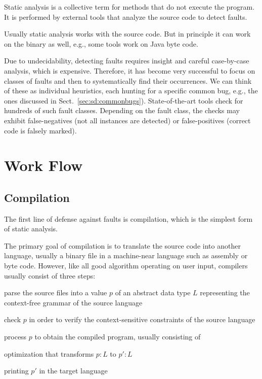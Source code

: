 Static analysis is a collective term for methods that do not execute the program.
It is performed by external tools that analyze the source code to detect faults.

Usually static analysis works with the source code.
But in principle it can work on the binary as well, e.g., some tools work on Java byte code.

Due to undecidability, detecting faults requires insight and careful case-by-case analysis, which is expensive.
Therefore, it has become very successful to focus on classes of faults and then to systematically find their occurrences.
We can think of these as individual heuristics, each hunting for a specific common bug, e.g., the ones discussed in Sect.~\ref{sec:sd:commonbugs}).
State-of-the-art tools check for hundreds of such fault classes.
Depending on the fault class, the checks may exhibit false-negatives (not all instances are detected) or false-positives (correct code is falsely marked).

\section{Work Flow}

\subsection{Compilation}

The first line of defense against faults is compilation, which is the simplest form of static analysis.

The primary goal of compilation is to translate the source code into another language, usually a binary file in a machine-near language such as assembly or byte code.
However, like all good algorithm operating on user input, compilers usually consist of three steps:
\begin{compactenum}
 \item parse the source files into a value $p$ of an abstract data type $L$ representing the context-free grammar of the source language
 \item check $p$ in order to verify the context-sensitive constraints of the source language
 \item process $p$ to obtain the compiled program, usually consisting of
   \begin{compactitem}
    \item optimization that transforms $p:L$ to $p':L$
    \item printing $p'$ in the target language
   \end{compactitem}
\end{compactenum}

